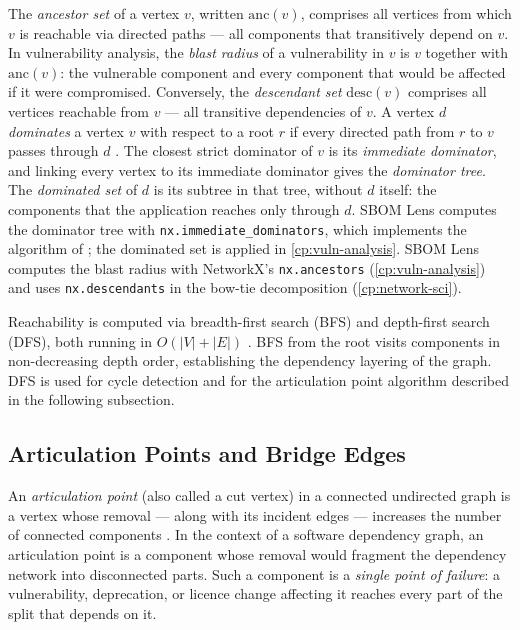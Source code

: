 The \textit{ancestor set} of a vertex \(v\), written \(\mathrm{anc}(v)\), comprises all vertices from which \(v\) is reachable via directed paths --- all components that transitively depend on \(v\). In vulnerability analysis, the \textit{blast radius} of a vulnerability in \(v\) is \(v\) together with \(\mathrm{anc}(v)\): the vulnerable component and every component that would be affected if it were compromised. Conversely, the \textit{descendant set} \(\mathrm{desc}(v)\) comprises all vertices reachable from \(v\) --- all transitive dependencies of \(v\). A vertex \(d\) \textit{dominates} a vertex \(v\) with respect to a root \(r\) if every directed path from \(r\) to \(v\) passes through \(d\) \citep{LengauerTarjan1979}. The closest strict dominator of \(v\) is its \textit{immediate dominator}, and linking every vertex to its immediate dominator gives the \textit{dominator tree}. The \textit{dominated set} of \(d\) is its subtree in that tree, without \(d\) itself: the components that the application reaches only through \(d\). SBOM Lens computes the dominator tree with \texttt{nx.immediate\_dominators}, which implements the algorithm of \citet{Cooper2006}; the dominated set is applied in \autoref{cp:vuln-analysis}. SBOM Lens computes the blast radius with NetworkX's \texttt{nx.ancestors} (\autoref{cp:vuln-analysis}) and uses \texttt{nx.descendants} in the bow-tie decomposition (\autoref{cp:network-sci}).

Reachability is computed via breadth-first search (BFS) and depth-first search (DFS), both running in \(O(|V| + |E|)\) \citep{CLRS4th}. BFS from the root visits components in non-decreasing depth order, establishing the dependency layering of the graph. DFS is used for cycle detection and for the articulation point algorithm described in the following subsection.


\subsection{Articulation Points and Bridge Edges}
\label{sec:articulation-points}

An \textit{articulation point} (also called a cut vertex) in a connected undirected graph is a vertex whose removal --- along with its incident edges --- increases the number of connected components \citep{CLRS4th}. In the context of a software dependency graph, an articulation point is a component whose removal would fragment the dependency network into disconnected parts. Such a component is a \textit{single point of failure}: a vulnerability, deprecation, or licence change affecting it reaches every part of the split that depends on it.

